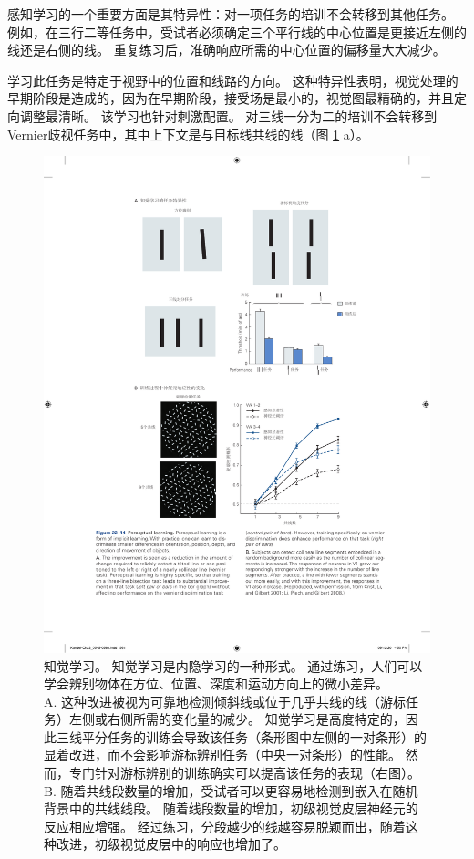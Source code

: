 感知学习的一个重要方面是其特异性：对一项任务的培训不会转移到其他任务。
例如，在三行二等任务中，受试者必须确定三个平行线的中心位置是更接近左侧的线还是右侧的线。
重复练习后，准确响应所需的中心位置的偏移量大大减少。


学习此任务是特定于视野中的位置和线路的方向。
这种特异性表明，视觉处理的早期阶段是造成的，因为在早期阶段，接受场是最小的，视觉图最精确的，并且定向调整最清晰。
该学习也针对刺激配置。
对三线一分为二的培训不会转移到Vernier歧视任务中，其中上下文是与目标线共线的线（图 \ref{fig:23_14} a）。

\begin{figure}[htbp]
	\centering
	\includegraphics[width=0.65\linewidth]{chap23/fig_23_14}
	\caption{知觉学习。
		知觉学习是内隐学习的一种形式。
		通过练习，人们可以学会辨别物体在方位、位置、深度和运动方向上的微小差异。\protect\\
		A. 这种改进被视为可靠地检测倾斜线或位于几乎共线的线（游标任务）左侧或右侧所需的变化量的减少。
		知觉学习是高度特定的，因此三线平分任务的训练会导致该任务（条形图中左侧的一对条形）的显着改进，而不会影响游标辨别任务（中央一对条形）的性能。
		然而，专门针对游标辨别的训练确实可以提高该任务的表现（右图）。\protect\\
		B. 随着共线段数量的增加，受试者可以更容易地检测到嵌入在随机背景中的共线线段。
		随着线段数量的增加，初级视觉皮层神经元的反应相应增强。
		经过练习，分段越少的线越容易脱颖而出，随着这种改进，初级视觉皮层中的响应也增加了\cite{crist2001learning,li2008learning}。}
	\label{fig:23_14}
\end{figure}


